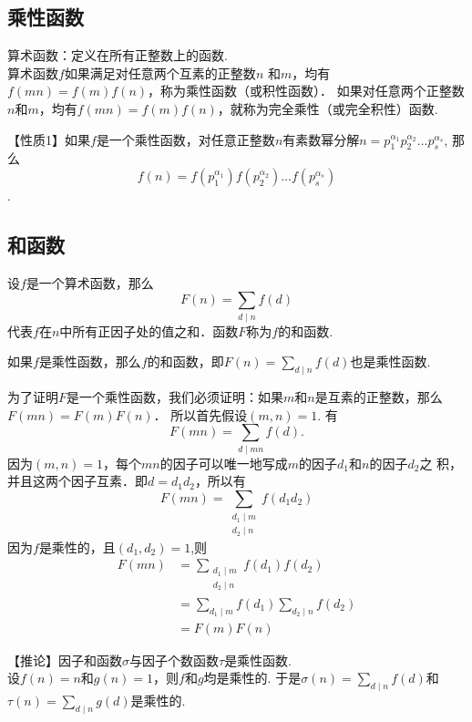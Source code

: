   \Teach{}

  \newtheorem*{Theorem}{定理}
  \makefront
\vspace{-1.5em}

\subsection{乘性函数}
    算术函数：定义在所有正整数上的函数.\\
    算术函数$f$如果满足对任意两个互素的正整数$n$ 和$m$，均有$f(mn)=f(m)f(n)$，称为乘性函数（或积性函数）．
    如果对任意两个正整数$n$和$m$，均有$f(mn)=f(m)f(n)$，就称为完全乘性（或完全积性）函数.

    【性质1】如果$f$是一个乘性函数，对任意正整数$n$有素数幂分解$n=p_1^{\alpha_1}p_2^{\alpha_2}\ldots p_s^{\alpha_s}$,
    那么\[f(n)=f(p_1^{\alpha_1})f(p_2^{\alpha_2})\ldots f(p_s^{\alpha_s})\].
\subsection{和函数}
    设$f$是一个算术函数，那么
    \[F(n) = \sum_{d\mid n}f(d)\]
    代表$f$在$n$中所有正因子处的值之和．函数$F$称为$f$的和函数.

    如果$f$是乘性函数，那么$f$的和函数，即$F(n) = \sum \limits_{d\mid n} f(d)$也是乘性函数.

    为了证明$F$是一个乘性函数，我们必须证明：如果$m$和$n$是互素的正整数，那么$F(mn)=F(m)F(n)$．
    所以首先假设$(m,n)=1$.
    有\[F(mn) = \sum_{d\mid mn}f(d).\]
        因为$(m,n)=1$，每个$mn$的因子可以唯一地写成$m$的因子$d_1$和$n$的因子$d_2$之
        积，并且这两个因子互素．即$d=d_1d_2$，所以有
        \[F(mn) = \sum_{\substack{d_1\mid m \\d_2\mid n}}f(d_1d_2)\]
        因为$f$是乘性的，且$(d_1,d_2)=1$,则
        \[
            \begin{aligned} 
                F(mn) &= \sum_{\substack{d_1\mid m \\d_2\mid n}}f(d_1)f(d_2)\\
                &=\sum_{d_1\mid m }f(d_1)\sum_{d_2\mid n }f(d_2)\\
                &=F(m)F(n)
            \end{aligned}
        \]

        【推论】因子和函数$\sigma$与因子个数函数$\tau$是乘性函数.\\
        设$f(n)=n$和$g(n)=1$，则$f$和$g$均是乘性的.
        于是$\sigma(n)=\sum \limits_{d\mid n} f(d)$和$\tau(n)=\sum \limits_{d\mid n} g(d)$是乘性的.
  
